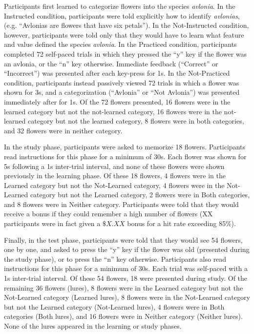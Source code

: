 \documentclass[twocolumn]{svjour3}          %
\begin{document}
Participants first learned to categorize flowers into the species
\emph{avlonia}. In the Instructed condition, participants were told
explicitly how to identify \emph{avlonias}, (e.g. ``Avlonias are
flowers that have six petals''). In the Not-Instructed condition,
however, participants were told only that they would have to learn
what feature and value defined the species \emph{avlonia}. In the
Practiced condition, participants completed 72 self-paced trials in
which they pressed the ``y'' key if the flower was an avlonia, or the
``n'' key otherwise. Immediate feedback (``Correct'' or ``Incorrect'')
was presented after each key-press for 1s. In the Not-Practiced
condition, participants instead passively viewed 72 trials in which a
flower was shown for 3s, and a categorization (``Avlonia'' or ``Not
Avlonia'') was presented immediately after for 1s. Of the 72 flowers
presented, 16 flowers were in the learned category but not the
not-learned category, 16 flowers were in the not-learned category but
not the learned category, 8 flowers were in both categories, and 32
flowers were in neither category.

In the study phase, participants were asked to memorize 18
flowers. Participants read instructions for this phase for a minimum
of 30s.  Each flower was shown for 5s following a 1s inter-trial
interval, and none of these flowers were shown previously in the
learning phase. Of these 18 flowers, 4 flowers were in the Learned
category but not the Not-Learned category, 4 flowers were in the
Not-Learned category but not the Learned category, 2 flowers were in
Both categories, and 8 flowers were in Neither category. Participants
were told that they would receive a bonus if they could remember a
high number of flowers (XX participants were in fact given a $\$X.XX$
bonus for a hit rate exceeding 85\%).

Finally, in the test phase, participants were told that they would see
54 flowers, one by one, and asked to press the ``y'' key if the flower
was old (presented during the study phase), or to press the ``n'' key
otherwise. Participants also read instructions for this phase for a
minimum of 30s. Each trial was self-paced with a 1s inter-trial
interval. Of these 54 flowers, 18 were presented during study. Of the
remaining 36 flowers (lures), 8 flowers were in the Learned category
but not the Not-Learned category (Learned lures), 8 flowers were in
the Not-Learned category but not the Learned category (Not-Learned
lures), 4 flowers were in Both categories (Both lures), and 16 flowers
were in Neither category (Neither lures). None of the lures appeared
in the learning or study phases.
\end{document}
